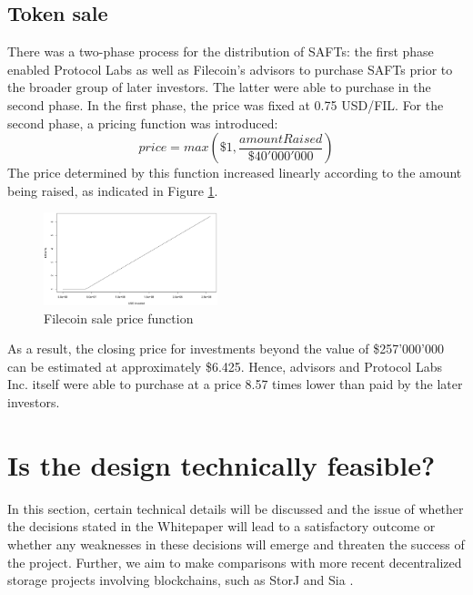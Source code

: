 \documentclass[conference]{IEEEtran}
\begin{document}
\subsection{Token sale}
\label{subsec:token-sale}
There was a two-phase process for the distribution of SAFTs: the first phase enabled Protocol Labs as well as Filecoin's advisors to purchase SAFTs prior to the broader group of later investors. 
The latter were able to purchase in the second phase.
In the first phase, the price was fixed at 0.75 USD/FIL.
For the second phase, a pricing function was introduced:
\[ price = max(\$1, \frac{amountRaised}{\$40'000'000}) \]
The price determined by this function increased linearly according to the amount being raised, as indicated in Figure \ref{fig:sale-price}.
\begin{figure}[h]
\centering
\includegraphics[width=0.45\textwidth]{filecoin-tokensale.png}
\caption{Filecoin sale price function}
\label{fig:sale-price}
\end{figure}
As a result, the closing price for investments beyond the value of \$257'000'000 can be estimated at approximately \$6.425.
Hence, advisors and Protocol Labs Inc. itself were able to purchase at a price 8.57 times lower than paid by the later investors.

\section{Is the design technically feasible?}
\label{sec:tech-feasibility}
In this section, certain technical details will be discussed and the issue of whether the decisions stated in the Whitepaper\cite{filecoin} will lead to a satisfactory outcome or whether any weaknesses in these decisions will emerge and threaten the success of the project.
Further, we aim to make comparisons with more recent decentralized storage projects involving blockchains, such as StorJ \cite{storj} and Sia \cite{sia}.
\end{document}
